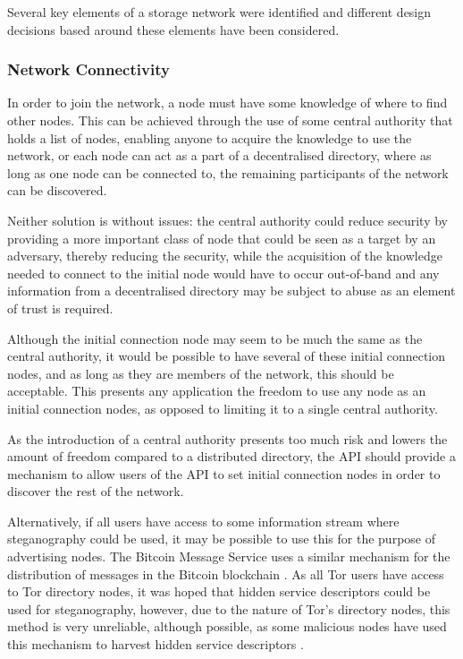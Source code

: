 Several key elements of a storage network were identified and different design decisions based around these elements have been considered. 
		
		\subsubsection{Network Connectivity}
			In order to join the network, a node must have some knowledge of where to find other nodes. This can be achieved through the use of some central authority that holds a list of nodes, enabling anyone to acquire the knowledge to use the network, or each node can act as a part of a decentralised directory, where as long as one node can be connected to, the remaining participants of the network can be discovered.
			
			Neither solution is without issues: the central authority could reduce security by providing a more important class of node that could be seen as a target by an adversary, thereby reducing the security, while the acquisition of the knowledge needed to connect to the initial node would have to occur out-of-band and any information from a decentralised directory may be subject to abuse as an element of trust is required.
			
			Although the initial connection node may seem to be much the same as the central authority, it would be possible to have several of these initial connection nodes, and as long as they are members of the network, this should be acceptable. This presents any application the freedom to use any node as an initial connection nodes, as opposed to limiting it to a single central authority.
			
			As the introduction of a central authority presents too much risk and lowers the amount of freedom compared to a distributed directory, the API should provide a mechanism to allow users of the API to set initial connection nodes in order to discover the rest of the network.
			
			Alternatively, if all users have access to some information stream where steganography could be used, it may be possible to use this for the purpose of advertising nodes. The Bitcoin Message Service uses a similar mechanism for the distribution of messages in the Bitcoin blockchain \cite{btcmsg}. As all Tor users have access to Tor directory nodes, it was hoped that hidden service descriptors could be used for steganography, however, due to the nature of Tor's directory nodes, this method is very unreliable, although possible, as some malicious nodes have used this mechanism to harvest hidden service descriptors \cite{crawl}.
			
